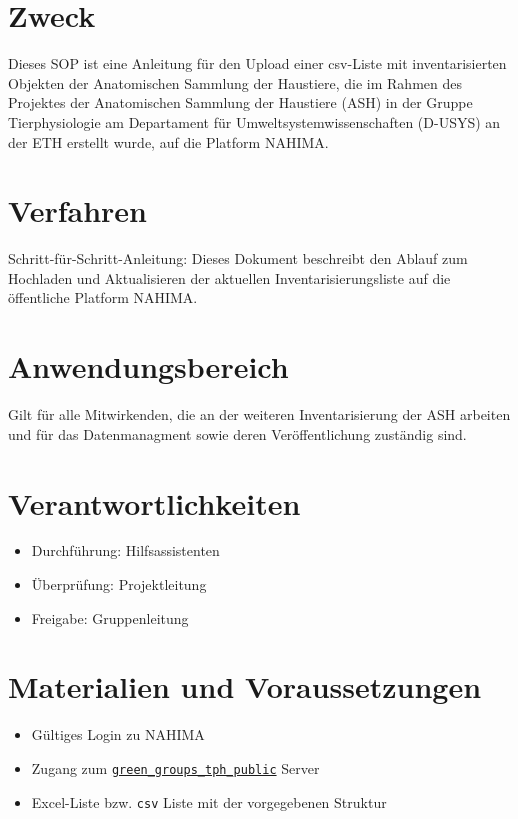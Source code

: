 \section{Zweck}
Dieses SOP ist eine Anleitung für den Upload einer csv-Liste mit inventarisierten Objekten der Anatomischen Sammlung der Haustiere, die im Rahmen des Projektes der Anatomischen Sammlung der Haustiere (ASH) in der Gruppe Tierphysiologie am Departament für Umweltsystemwissenschaften (D-USYS) an der ETH  erstellt wurde, auf die Platform NAHIMA.

\section{Verfahren}
Schritt-für-Schritt-Anleitung:
Dieses Dokument beschreibt den Ablauf zum Hochladen und Aktualisieren der aktuellen Inventarisierungsliste auf die öffentliche Platform NAHIMA.

\section{Anwendungsbereich}
Gilt für alle Mitwirkenden, die an der weiteren Inventarisierung der ASH arbeiten und für das Datenmanagment sowie deren Veröffentlichung zuständig sind.

\section{Verantwortlichkeiten}
\begin{itemize}
    \item Durchführung: Hilfsassistenten
    \item Überprüfung: Projektleitung  
    \item Freigabe: Gruppenleitung
\end{itemize}

\section{Materialien und Voraussetzungen}
\begin{itemize}
    \item Gültiges Login zu NAHIMA
    \item Zugang zum \texttt{\url{green_groups_tph_public}} Server
    \item Excel-Liste bzw. \texttt{csv} Liste mit der vorgegebenen Struktur
\end{itemize}

